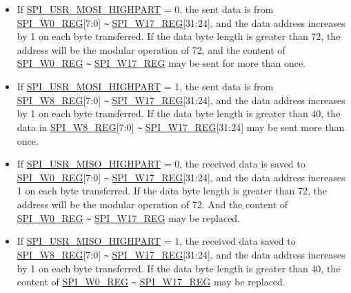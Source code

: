 \documentclass[main\_\_EN.tex]{subfiles}
\begin{document}
\begin{itemize}
    \item If \hyperref[fielddesc:SPIUSRMOSIHIGHPART]{SPI\_USR\_MOSI\_HIGHPART} = 0, the sent data is from \hyperref[regdesc:SPIW0REG]{SPI\_W0\_REG}[7:0] \verb+~+ \hyperref[regdesc:SPIW17REG]{SPI\_W17\_REG}[31:24], and the data address increases by 1 on each byte transferred. If the data byte length is greater than 72, the address will be the modular operation of 72, and the content of \hyperref[regdesc:SPIW0REG]{SPI\_W0\_REG} \verb+~+ \hyperref[regdesc:SPIW17REG]{SPI\_W17\_REG} may be sent for more than once.

    \item If \hyperref[fielddesc:SPIUSRMOSIHIGHPART]{SPI\_USR\_MOSI\_HIGHPART} = 1, the sent data is from \hyperref[regdesc:SPIW8REG]{SPI\_W8\_REG}[7:0] \verb+~+ \hyperref[regdesc:SPIW17REG]{SPI\_W17\_REG}[31:24], and the data address increases by 1 on each byte transferred. If the data byte length is greater than 40, the data in \hyperref[regdesc:SPIW8REG]{SPI\_W8\_REG}[7:0] \verb+~+ \hyperref[regdesc:SPIW17REG]{SPI\_W17\_REG}[31:24] may be sent more than once.

    \item If \hyperref[fielddesc:SPIUSRMISOHIGHPART]{SPI\_USR\_MISO\_HIGHPART} = 0, the received data is saved to \hyperref[regdesc:SPIW0REG]{SPI\_W0\_REG}[7:0] \verb+~+ \hyperref[regdesc:SPIW17REG]{SPI\_W17\_REG}[31:24], and the data address increases 1 on each byte transferred. If the data byte length is greater than 72, the address will be the modular operation of 72. And the content of \hyperref[regdesc:SPIW0REG]{SPI\_W0\_REG} \verb+~+ \hyperref[regdesc:SPIW17REG]{SPI\_W17\_REG} may be replaced.

    \item If \hyperref[fielddesc:SPIUSRMISOHIGHPART]{SPI\_USR\_MISO\_HIGHPART} = 1, the received data saved to \hyperref[regdesc:SPIW8REG]{SPI\_W8\_REG}[7:0] \verb+~+ \hyperref[regdesc:SPIW17REG]{SPI\_W17\_REG}[31:24], and the data address increases by 1 on each byte transferred. If the data byte length is greater than 40, the content of \hyperref[regdesc:SPIW0REG]{SPI\_W0\_REG} \verb+~+ \hyperref[regdesc:SPIW17REG]{SPI\_W17\_REG} may be replaced.

\end{itemize}
\end{document}
